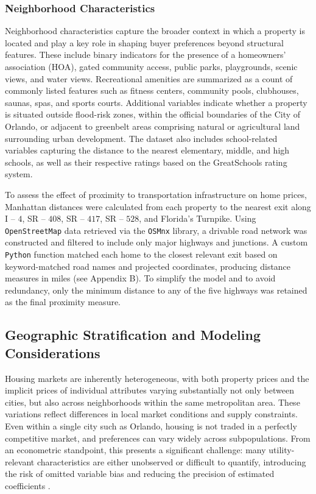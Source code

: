 \subsubsection*{Neighborhood Characteristics}

Neighborhood characteristics capture the broader context in which a property is located and play a key role in shaping buyer preferences beyond structural features. These include binary indicators for the presence of a homeowners’ association (HOA), gated community access, public parks, playgrounds, scenic views, and water views. Recreational amenities are summarized as a count of commonly listed features such as fitness centers, community pools, clubhouses, saunas, spas, and sports courts. Additional variables indicate whether a property is situated outside flood-risk zones, within the official boundaries of the City of Orlando, or adjacent to greenbelt areas comprising natural or agricultural land surrounding urban development. The dataset also includes school-related variables capturing the distance to the nearest elementary, middle, and high schools, as well as their respective ratings based on the GreatSchools rating system.

To assess the effect of proximity to transportation infrastructure on home prices, Manhattan distances were calculated from each property to the nearest exit along I -- $4$, SR -- $408$, SR -- $417$, SR -- $528$, and Florida’s Turnpike. Using \texttt{OpenStreetMap} data retrieved via the \texttt{OSMnx} library, a drivable road network was constructed and filtered to include only major highways and junctions. A custom \texttt{Python} function matched each home to the closest relevant exit based on keyword-matched road names and projected coordinates, producing distance measures in miles (see Appendix B). To simplify the model and to avoid redundancy, only the minimum distance to any of the five highways was retained as the final proximity measure.



\subsection*{Geographic Stratification and Modeling Considerations}

Housing markets are inherently heterogeneous, with both property prices and the implicit prices of individual attributes varying substantially not only between cities, but also across neighborhoods within the same metropolitan area. These variations reflect differences in local market conditions and supply constraints. Even within a single city such as Orlando, housing is not traded in a perfectly competitive market, and preferences can vary widely across subpopulations. From an econometric standpoint, this presents a significant challenge: many utility-relevant characteristics are either unobserved or difficult to quantify, introducing the risk of omitted variable bias and reducing the precision of estimated coefficients \citep{abelson:1979}.

